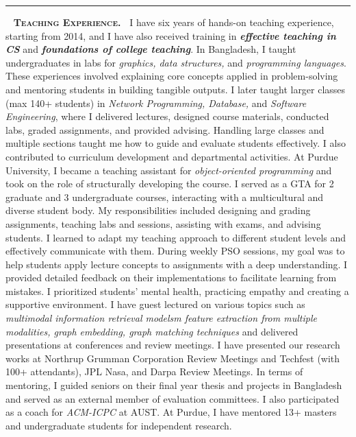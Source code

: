 \documentclass[9pt]{article}
\begin{document}
\medskip
\noindent\rule{2cm}{4pt}~\textbf{\textsc{ Teaching Experience.~}}
%
I have six years of hands-on teaching experience, starting from 2014, and I have also received training in \textit{\textbf{effective teaching in CS}} and \textit{\textbf{foundations of college teaching}}. 
%
In Bangladesh, I taught undergraduates in labs for \textit{graphics, data structures,} and \textit{programming languages}. These experiences involved explaining core concepts applied in problem-solving and mentoring students in building tangible outputs. I later taught larger classes (max 140+ students) in \textit{Network Programming, Database,} and \textit{Software Engineering}, where I delivered lectures, designed course materials, conducted labs, graded assignments, and provided advising. Handling large classes and multiple sections taught me how to guide and evaluate students effectively. I also contributed to curriculum development and departmental activities.
%
At Purdue University, I became a teaching assistant for \textit{object-oriented programming} and took on the role of structurally developing the course. I served as a GTA for 2 graduate and 3 undergraduate courses, interacting with a multicultural and diverse student body. My responsibilities included designing and grading assignments, teaching labs and sessions, assisting with exams, and advising students. I learned to adapt my teaching approach to different student levels and effectively communicate with them.
%
During weekly PSO sessions, my goal was to help students apply lecture concepts to assignments with a deep understanding. I provided detailed feedback on their implementations to facilitate learning from mistakes. I prioritized students' mental health, practicing empathy and creating a supportive environment. I have guest lectured on various topics such as \textit{multimodal information retrieval modelsm feature extraction from multiple modalities, graph embedding, graph matching techniques} and delivered presentations at conferences and review meetings.
I have presented our research works at Northrup Grumman Corporation Review Meetings and Techfest (with 100+ attendants), JPL Nasa, and Darpa Review Meetings.
%
In terms of mentoring, I guided seniors on their final year thesis and projects in Bangladesh and served as an external member of evaluation committees. I also participated as a coach for
\textit{ACM-ICPC} at AUST.
At Purdue, I have mentored 13+ masters and undergraduate students for independent research. 
\end{document}
